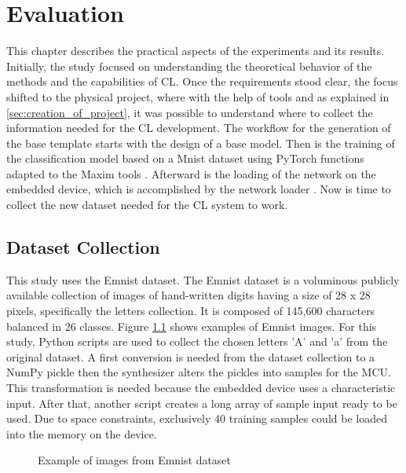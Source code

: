 \chapter{Evaluation}
\label{cha:evaluation}

\quad This chapter describes the practical aspects of the experiments and its results. Initially, the study focused on understanding the theoretical behavior of the methods and the capabilities of CL. Once the requirements stood clear, the focus shifted to the physical project, where with the help of tools \cite{SDK} and as explained in \ref{sec:creation_of_project}, it was possible to understand where to collect the information needed for the CL development. The workflow for the generation of the base template starts with the design of a base model. Then is the training of the classification model based on a Mnist dataset \cite{deng2012mnist} using PyTorch functions adapted to the Maxim tools \cite{ai8x-training}. Afterward is the loading of the network on the embedded device, which is accomplished by the network loader \cite{ai8x-synthesis}. Now is time to collect the new dataset \cite{cohen2017emnist} needed for the CL system to work.

\section{Dataset Collection}
\label{sec:dataset_collection}

\quad This study uses the Emnist dataset. The Emnist dataset is a voluminous publicly available collection of images of hand-written digits having a size of 28 x 28 pixels, specifically the letters collection. It is composed of 145,600 characters balanced in 26 classes. Figure \ref{emnist_example} shows examples of Emnist images. For this study, Python scripts are used to collect the chosen letters 'A' and 'a' from the original dataset. A first conversion is needed from the dataset collection to a NumPy pickle then the synthesizer alters the pickles into samples for the MCU. This transformation is needed because the embedded device uses a characteristic input. After that, another script creates a long array of sample input ready to be used. Due to space constraints, exclusively 40 training samples could be loaded into the memory on the device.  

\begin{figure}[!ht]
\centerline{}
\caption{Example of images from Emnist dataset}
\label{emnist_example}
\end{figure}

